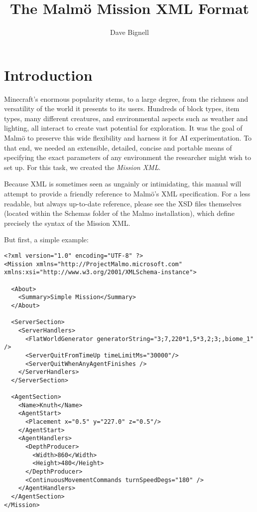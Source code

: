 \documentclass[11pt]{article} %
\title{The Malm\"o Mission XML Format}
\author{Dave Bignell}
\begin{document}
\maketitle
\tableofcontents

\section{Introduction}

Minecraft's enormous popularity stems, to a large degree, from the richness and versatility of the world it presents to its 
users. Hundreds of block types, item types, many different creatures, and environmental aspects such as weather and lighting, 
all interact to create vast potential for exploration. It was the goal of Malm\"o to preserve this wide flexibility and harness 
it for AI experimentation. To that end, we needed an extensible, detailed, concise and portable means of specifying the exact 
parameters of any environment the researcher might wish to set up. For this task, we created the \emph{Mission XML}.

Because XML is sometimes seen as ungainly or intimidating, this manual will attempt to provide a friendly reference to Malm\"o's XML specification. For a less readable, but always up-to-date reference, please see the XSD files themselves (located within the Schemas folder of the Malmo installation), which define precisely the syntax of the Mission XML.

But first, a simple example:

\begin{lstlisting}[frame=lines]
<?xml version="1.0" encoding="UTF-8" ?>
<Mission xmlns="http://ProjectMalmo.microsoft.com" xmlns:xsi="http://www.w3.org/2001/XMLSchema-instance">
    
  <About>
    <Summary>Simple Mission</Summary>
  </About>

  <ServerSection>
    <ServerHandlers>
      <FlatWorldGenerator generatorString="3;7,220*1,5*3,2;3;,biome_1" />
      <ServerQuitFromTimeUp timeLimitMs="30000"/>
      <ServerQuitWhenAnyAgentFinishes />
    </ServerHandlers>
  </ServerSection>

  <AgentSection>
    <Name>Knuth</Name>
    <AgentStart>
      <Placement x="0.5" y="227.0" z="0.5"/>
    </AgentStart>
    <AgentHandlers>
      <DepthProducer>
        <Width>860</Width>
        <Height>480</Height>
      </DepthProducer>
      <ContinuousMovementCommands turnSpeedDegs="180" />
    </AgentHandlers>
  </AgentSection>
</Mission>
\end{lstlisting}  
\end{document}
